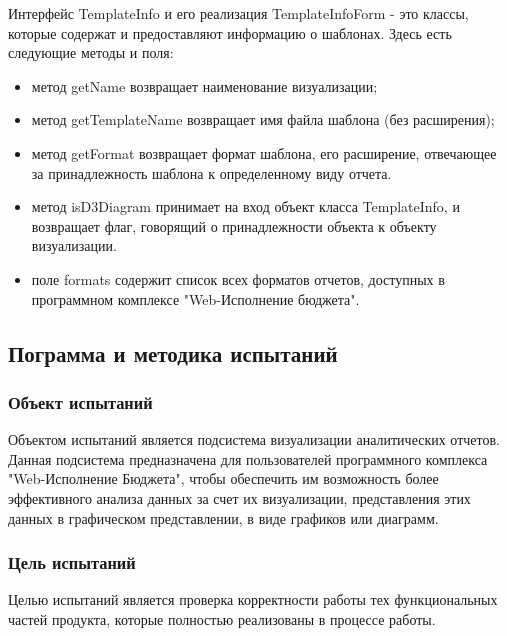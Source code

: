\documentclass[a4paper]{extarticle}
\numberwithin{equation}{section}
\begin{document}
Интерфейс TemplateInfo и его реализация TemplateInfoForm - это классы, которые содержат и предоставляют информацию о шаблонах. Здесь есть следующие методы и поля:
\begin{itemize}
\item метод getName возвращает наименование визуализации;
\item метод getTemplateName возвращает имя файла шаблона (без расширения);
\item метод getFormat возвращает формат шаблона, его расширение, отвечающее за принадлежность шаблона к определенному виду отчета.
\item метод isD3Diagram принимает на вход объект класса TemplateInfo, и возвращает флаг, говорящий о принадлежности объекта к объекту визуализации.
\item поле formats содержит список всех форматов отчетов, доступных в программном комплексе "Web-Исполнение бюджета".
\end{itemize}

\subsection{Пограмма и методика испытаний}

\subsubsection{Объект испытаний}
Объектом испытаний является подсистема визуализации аналитических отчетов. Данная подсистема предназначена для пользователей программного комплекса "Web-Исполнение Бюджета", чтобы обеспечить им возможность более эффективного анализа данных за счет их визуализации, представления этих данных в графическом представлении, в виде графиков или диаграмм.

\subsubsection{Цель испытаний}
Целью испытаний является проверка корректности работы тех функциональных частей продукта, которые полностью реализованы в процессе  работы.\par
\end{document}
